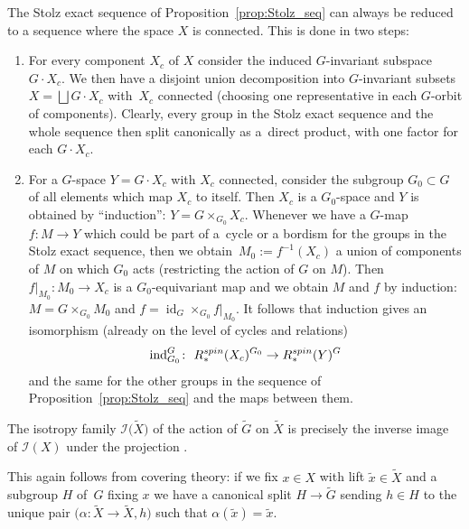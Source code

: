 \documentclass[11pt]{article}
\numberwithin{equation}{section}
\numberwithin{equation}{section}
\DeclareMathOperator{\id}{id}
\newcommand{\bigdisjointunion}{\bigsqcup}
\begin{document}
	\begin{Remark}
		The Stolz exact sequence of Proposition~\ref{prop:Stolz_seq} can always be
		reduced to a sequence where the space $X$ is connected. This is done in two
		steps:
		\begin{enumerate}\itemsep=0pt
			\item[(1)] For every component $X_c$ of $X$ consider the induced $G$-invariant
			subspace $G\cdot X_c$. We then have a disjoint union decomposition into
			$G$-invariant subsets $X=\bigdisjointunion G\cdot X_c$ with~$X_c$ connected
			(choosing one representative in each $G$-orbit of components).
			Clearly, every group in the Stolz exact sequence and the whole sequence
			then split canonically as a~direct product, with one factor for each
			$G\cdot X_c$.
			\item[(2)] For a $G$-space $Y=G\cdot X_c$ with $X_c$ connected, consider the
			subgroup $G_0\subset G$ of all elements which map $X_c$ to itself. Then
			$X_c$ is a $G_0$-space and $Y$ is obtained by ``induction'': $Y=
			G\times_{G_0}X_c$. Whenever we have a $G$-map $f\colon M\to Y$ which
			could be part of a~cycle or a bordism for the groups in the Stolz exact
			sequence, then we obtain~${M_0:=f^{-1}(X_c)}$ a union of components of $M$
			on which $G_0$ acts (restricting the action of $G$ on $M$). Then~${f|_{M_0}\colon M_0\to X_c}$ is a $G_0$-equivariant map and we obtain $M$ and
			$f$ by induction: $M=G\times_{G_0} M_0$ and $f=\id_G\times_{G_0}
			f|_{M_0}$.
			It follows that induction gives an isomorphism (already on the level of
			cycles and relations)
			\begin{equation*}
				\mathrm{ind}_{G_0}^G\colon\ R^{\rm spin}_*(X_c)^{G_0}\to R^{\rm spin}_*(Y)^G
			\end{equation*}
			and the same for the other groups in the sequence of Proposition~\ref{prop:Stolz_seq}
			and the maps between them.
		\end{enumerate}
	\end{Remark}
	
	\begin{Remark}
		The isotropy family $\mathcal{I}\bigl(\tilde{X}\bigr)$ of the action of $\widetilde{G}$
		on $\tilde{X}$ is precisely the inverse image of $\mathcal{I}(X)$ under the projection
		\smash{$\widetilde{G}\to G$}.
		
		This again follows from covering theory: if we fix $x\in X$ with lift
		$\tilde x\in\tilde{X}$ and a subgroup $H$ of~$G$ fixing $x$ we have a
		canonical split $H\to \widetilde{G}$ sending $h\in H$ to the unique pair
		$\bigl(\alpha\colon \tilde X\to \tilde{X},h\bigr)$ such that $\alpha(\tilde x)=\tilde
		x$.
	\end{Remark}
	
\end{document}
